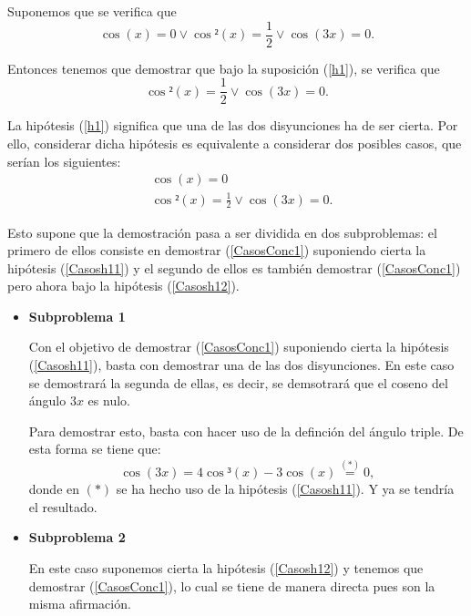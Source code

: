 \begin{demostracion}
  \noindent
  \framebox{\longrightarrow} Suponemos que se verifica que
  \begin{equation}\label{Casosh1}\tag{h1}
    \cos(x)=0 \lor \cos²(x)=\frac{1}{2} \lor \cos(3x)=0.
  \end{equation}

  Entonces tenemos que demostrar que bajo la suposición (\ref{h1}),
  se verifica que
  \begin{equation}\label{CasosConc1}
     \cos²(x)=\frac{1}{2} \lor \cos(3x)=0.
  \end{equation}

  La hipótesis (\ref{h1}) significa que una de las dos disyunciones
  ha de ser cierta. Por ello, considerar dicha hipótesis es
  equivalente a considerar dos posibles casos, que serían los
  siguientes:
  \begin{align}
    &\cos(x)=0 \label{Casosh11}\tag{h11}\\
    &\cos²(x)=\frac{1}{2}\lor \cos(3x)=0. \label{Casosh12}\tag{h12}
  \end{align}

  Esto supone que la demostración pasa a ser dividida en
  dos subproblemas: el primero de
  ellos consiste en demostrar (\ref{CasosConc1}) suponiendo
  cierta la hipótesis (\ref{Casosh11}) y el segundo de ellos
  es también demostrar (\ref{CasosConc1}) pero ahora bajo la
  hipótesis (\ref{Casosh12}).

  \begin{itemize}
  \item \textbf{Subproblema 1}
    
    Con el objetivo de demostrar (\ref{CasosConc1}) suponiendo
    cierta la hipótesis (\ref{Casosh11}), basta con demostrar una
    de las dos disyunciones. En este caso se demostrará la segunda
    de ellas, es decir, se demsotrará que el coseno del ángulo
    \(3x\) es nulo.

    Para demostrar esto, basta con hacer uso de la definción del
    ángulo triple. De esta forma se tiene que:
    \begin{equation}
      \cos(3x)=4\cos³(x)-3\cos(x)\stackrel{(*)}{=}0,
    \end{equation}
    donde en \((*)\) se ha hecho uso de la hipótesis
    (\ref{Casosh11}). Y ya se tendría el resultado.
    
  \item \textbf{Subproblema 2}

    En este caso suponemos cierta la hipótesis (\ref{Casosh12})
    y tenemos que demostrar (\ref{CasosConc1}), lo cual se tiene
    de manera directa pues son la misma afirmación.
  \end{itemize}


\end{demostracion}
